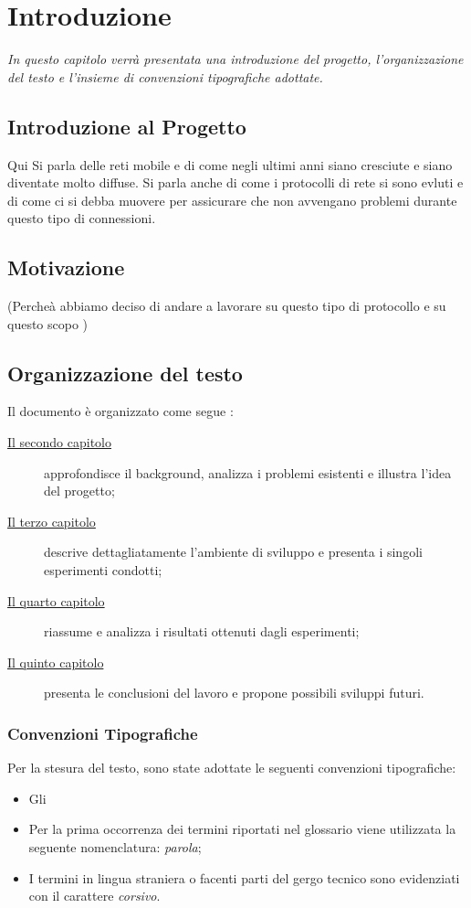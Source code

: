 \chapter{Introduzione}
\label{cap:introduzione}

\textit{\indent In questo capitolo verrà presentata una introduzione del progetto, l'organizzazione del testo e l'insieme di convenzioni tipografiche adottate.
}
\section{Introduzione al Progetto}

Qui Si parla delle reti mobile e di come negli ultimi anni siano cresciute e siano diventate molto diffuse. Si parla anche di come i protocolli di rete si sono evluti e di come ci si debba muovere per assicurare che non avvengano problemi durante questo tipo di connessioni. 


\section{Motivazione}

(Percheà abbiamo deciso di andare a lavorare su questo tipo di protocollo e su questo scopo )
\section{Organizzazione del testo}

\indent Il documento è organizzato come segue :
\begin{description}
    \item[{\hyperref[cap:descrizione]{Il secondo capitolo}}] approfondisce il background, analizza i problemi esistenti e illustra l'idea del progetto;
    
    \item[{\hyperref[cap:processi-metodologie]{Il terzo capitolo}}] descrive dettagliatamente l'ambiente di sviluppo e presenta i singoli esperimenti condotti;

    \item[{\hyperref[cap:risultati]{Il quarto capitolo}}] riassume e analizza i risultati ottenuti dagli esperimenti;
    
    \item[{\hyperref[cap:conclusioni]{Il quinto capitolo}}] presenta le conclusioni del lavoro e propone possibili sviluppi futuri.
\end{description}

\subsection{Convenzioni Tipografiche}
Per la stesura del testo, sono state adottate le seguenti convenzioni tipografiche:
\begin{itemize}
	\item Gli 
	\item Per la prima occorrenza dei termini riportati nel glossario viene utilizzata la seguente nomenclatura: \emph{parola}\glsfirstoccur;
	\item I termini in lingua straniera o facenti parti del gergo tecnico sono evidenziati con il carattere \emph{corsivo}.
\end{itemize}
